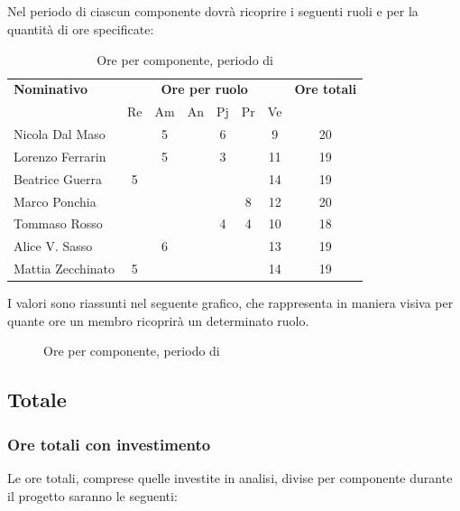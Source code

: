 \subsection{\VV}
Nel periodo di \VV{} ciascun componente dovrà ricoprire i seguenti ruoli e per la quantità di ore specificate:

\begin{table}[H]
	\centering
	\begin{tabular}{|l|c|c|c|c|c|c|c|}
		\hline
		\textbf{Nominativo} & 
		\multicolumn{6}{c|}{\textbf{Ore per ruolo}} & 
		\textbf{Ore totali} \\
		& Re & Am & An & Pj & Pr & Ve & \\
		\hline
		Nicola Dal Maso & &5 & &6 & &9 & 20 \\
		Lorenzo Ferrarin & &5 & &3 & &11 & 19 \\
		Beatrice Guerra &5 & & & & &14 & 19 \\
		Marco Ponchia & & & & &8 &12 & 20 \\
		Tommaso Rosso & & & &4 &4 &10 & 18 \\
		Alice V. Sasso & &6 & & & &13 & 19 \\
		Mattia Zecchinato &5 & & & & &14 & 19 \\
		\hline
	\end{tabular}
	\caption{Ore per componente, periodo di \VV{}}
\end{table}
I valori sono riassunti nel seguente grafico, che rappresenta in maniera visiva per quante ore un membro ricoprirà un determinato ruolo.
\begin{figure}[H]
	\centering
	\caption{Ore per componente, periodo di \VV{}}
\end{figure}

\subsection{Totale}
\subsubsection{Ore totali con investimento}
Le ore totali, comprese quelle investite in analisi, divise per componente durante il progetto saranno le seguenti:

